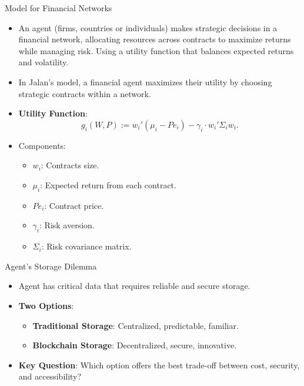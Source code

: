 \documentclass[aspectratio=169]{beamer}
\begin{document}
    
\begin{frame}{\citeauthor{jalan_incentive-aware_2024} Model for Financial Networks}
    \begin{itemize}
        \item An agent (firms, countries or individuals) makes strategic decisions in a financial network, allocating resources across contracts to maximize returns while managing risk. Using a utility function that balances expected returns and volatility.
        
        \item In Jalan's model, a financial agent maximizes their utility by choosing strategic contracts within a network.
        
        \item \textbf{Utility Function}:
        \[
        g_i(W, P) := w_i' (\mu_i - P e_i) - \gamma_i \cdot w_i' \Sigma_i w_i.
        \]
        \item Components:
        \begin{itemize}
            \item \( w_i \): Contracts size.
            \item \( \mu_i \): Expected return from each contract.
            \item \( P e_i \): Contract price.
            \item \( \gamma_i \): Risk aversion.
            \item \( \Sigma_i \): Risk covariance matrix.
        \end{itemize}
        
    \end{itemize}
\end{frame}


\begin{frame}{Agent’s Storage Dilemma}
    \begin{itemize}
        \item Agent has critical data that requires reliable and secure storage.
        \item \textbf{Two Options}:
        \begin{itemize}
            \item \textbf{Traditional Storage}: Centralized, predictable, familiar.
            \item \textbf{Blockchain Storage}: Decentralized, secure, innovative.
        \end{itemize}
        \item \textbf{Key Question}: Which option offers the best trade-off between cost, security, and accessibility?
    \end{itemize}
\end{frame}
\end{document}
